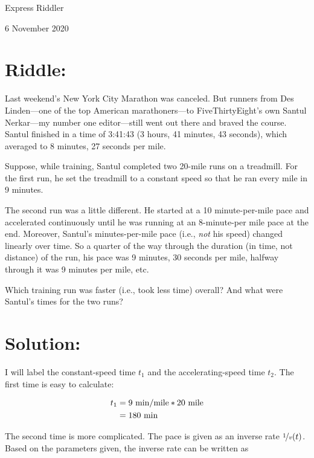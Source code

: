 \documentclass{article}
\begin{document}
\pagestyle{empty} %

\begin{center}
{\LARGE Express Riddler}

\vspace{0.15in}

{\Large 6 November 2020}
\end{center}


\section*{Riddle:}

Last weekend's New York City Marathon was canceled.
But runners from Des Linden---one of the top American marathoners---to FiveThirtyEight's own Santul Nerkar---my number one editor---still went out there and braved the course.
Santul finished in a time of 3:41:43 (3 hours, 41 minutes, 43 seconds), which averaged to 8 minutes, 27 seconds per mile.

Suppose, while training, Santul completed two 20-mile runs on a treadmill.
For the first run, he set the treadmill to a constant speed so that he ran every mile in 9 minutes.

The second run was a little different.
He started at a 10 minute-per-mile pace and accelerated continuously until he was running at an 8-minute-per mile pace at the end.
Moreover, Santul's minutes-per-mile pace (i.e., \textit{not} his speed) changed linearly over time.
So a quarter of the way through the duration (in time, not distance) of the run, his pace was 9 minutes, 30 seconds per mile, halfway through it was 9 minutes per mile, etc.

Which training run was faster (i.e., took less time) overall?
And what were Santul's times for the two runs?


\section*{Solution:}

I will label the constant-speed time $t_{1}$ and the accelerating-speed time $t_{2}$.
The first time is easy to calculate:

\begin{align*}
t_{1} &= 9~\rm{min/mile}*20~\rm{mile} \\
      &= 180~\rm{min}
\end{align*}

The second time is more complicated.
The pace is given as an inverse rate $\nicefrac{1}{v}(t)$.
Based on the parameters given, the inverse rate can be written as
\end{document}
